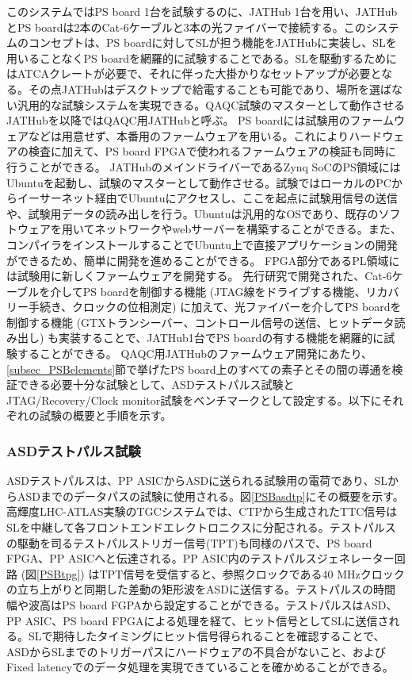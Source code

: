 このシステムではPS board 1台を試験するのに、JATHub 1台を用い、JATHubとPS boardは2本のCat-6ケーブルと3本の光ファイバーで接続する。このシステムのコンセプトは、PS boardに対してSLが担う機能をJATHubに実装し、SLを用いることなくPS boardを網羅的に試験することである。SLを駆動するためにはATCAクレートが必要で、それに伴った大掛かりなセットアップが必要となる。その点JATHubはデスクトップで給電することも可能であり、場所を選ばない汎用的な試験システムを実現できる。QAQC試験のマスターとして動作させるJATHubを以降ではQAQC用JATHubと呼ぶ。
PS boardには試験用のファームウェアなどは用意せず、本番用のファームウェアを用いる。これによりハードウェアの検査に加えて、PS board FPGAで使われるファームウェアの検証も同時に行うことができる。
JATHubのメインドライバーであるZynq SoCのPS領域にはUbuntuを起動し、試験のマスターとして動作させる。試験ではローカルのPCからイーサーネット経由でUbuntuにアクセスし、ここを起点に試験用信号の送信や、試験用データの読み出しを行う。Ubuntuは汎用的なOSであり、既存のソフトウェアを用いてネットワークやwebサーバーを構築することができる。また、コンパイラをインストールすることでUbuntu上で直接アプリケーションの開発ができるため、簡単に開発を進めることができる。
FPGA部分であるPL領域には試験用に新しくファームウェアを開発する。
先行研究で開発された、Cat-6ケーブルを介してPS boardを制御する機能 (JTAG線をドライブする機能、リカバリー手続き、クロックの位相測定) に加えて、光ファイバーを介してPS boardを制御する機能 (GTXトランシーバー、コントロール信号の送信、ヒットデータ読み出し) も実装することで、JATHub1台でPS boardの有する機能を網羅的に試験することができる。
QAQC用JATHubのファームウェア開発にあたり、\ref{subsec_PSBelements}節で挙げたPS board上のすべての素子とその間の導通を検証できる必要十分な試験として、ASDテストパルス試験とJTAG/Recovery/Clock monitor試験をベンチマークとして設定する。以下にそれぞれの試験の概要と手順を示す。

\subsubsection{ASDテストパルス試験}
\label{subsubsec_testpulse}
\baselineskip

ASDテストパルスは、PP ASICからASDに送られる試験用の電荷であり、SLからASDまでのデータパスの試験に使用される。図\ref{PSBasdtp}にその概要を示す。高輝度LHC-ATLAS実験のTGCシステムでは、CTPから生成されたTTC信号はSLを中継して各フロントエンドエレクトロニクスに分配される。テストパルスの駆動を司るテストパルストリガー信号(TPT)も同様のパスで、PS board FPGA、PP ASICへと伝達される。PP ASIC内のテストパルスジェネレーター回路 (図\ref{PSBtpg}) はTPT信号を受信すると、参照クロックである40 MHzクロックの立ち上がりと同期した差動の矩形波をASDに送信する。テストパルスの時間幅や波高はPS board FGPAから設定することができる。テストパルスはASD、PP ASIC、PS board FPGAによる処理を経て、ヒット信号としてSLに送信される。SLで期待したタイミングにヒット信号得られることを確認することで、ASDからSLまでのトリガーパスにハードウェアの不具合がないこと、およびFixed latencyでのデータ処理を実現できていることを確かめることができる。
\baselineskip

